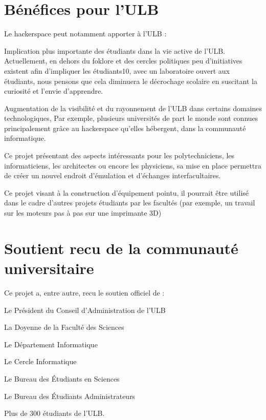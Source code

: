 \documentclass[a4paper]{article}
\begin{document}
\section{Bénéfices pour l'ULB} %
Le hackerspace peut notamment apporter à l’ULB :
\begin{list}{-}{} 
\item  Implication plus importante des étudiants dans la vie active de l’ULB.  Actuellement, en dehors du foklore et des cercles politiques peu  d’initiatives existent afin d’impliquer les étudiants10, avec un  laboratoire ouvert aux étudiants, nous pensons que cela diminuera le  décrochage scolaire en suscitant la curiosité et l’envie d’apprendre.
\item  Augmentation de la visibilité et du rayonnement de l’ULB dans certains  domaines technologiques, Par exemple, plusieurs universités de part le  monde sont connues principalement grâce au hackerspace qu’elles  hébergent, dans la communauté informatique.
\item  Ce projet présentant des aspects intéressants pour les  polytechniciens, les informaticiens, les architectes ou encore les  physiciens, sa mise en place permettra de créer un nouvel endroit  d’émulation et d’échanges interfacultaires.
\item  Ce projet visant à la construction d’équipement pointu, il pourrait  être utilisé dans le cadre d’autres projets étudiants par les  facultés (par exemple, un travail sur les moteurs pas à pas sur une  imprimante 3D)
\end{list}  


\section{Soutient recu de la communauté universitaire}
\begin{list}{-}{} Ce projet a, entre autre, recu le soutien officiel de : 
\item Le Président du Conseil d’Administration de l’ULB
\item La Doyenne de la Faculté des Sciences
\item Le Département Informatique
\item Le Cercle Informatique
\item Le Bureau des Étudiants en Sciences
\item Le Bureau des Étudiants Administrateurs
\item Plus de 300 étudiants de l’ULB. 
\end{list}
\end{document}
